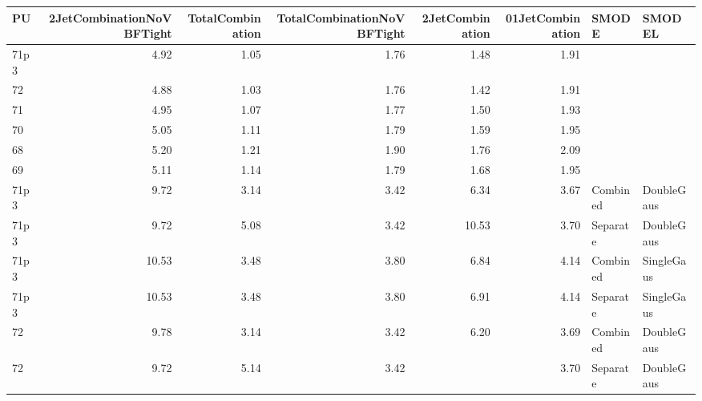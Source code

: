 \begin{tabular}{lrrrrrll}
\hline
 PU   &   2JetCombinationNoVBFTight &   TotalCombination &   TotalCombinationNoVBFTight &   2JetCombination &   01JetCombination & SMODE    & SMODEL     \\
\hline
 71p3 &                        4.92 &               1.05 &                         1.76 &              1.48 &               1.91 &          &            \\
 72   &                        4.88 &               1.03 &                         1.76 &              1.42 &               1.91 &          &            \\
 71   &                        4.95 &               1.07 &                         1.77 &              1.50 &               1.93 &          &            \\
 70   &                        5.05 &               1.11 &                         1.79 &              1.59 &               1.95 &          &            \\
 68   &                        5.20 &               1.21 &                         1.90 &              1.76 &               2.09 &          &            \\
 69   &                        5.11 &               1.14 &                         1.79 &              1.68 &               1.95 &          &            \\
 71p3 &                        9.72 &               3.14 &                         3.42 &              6.34 &               3.67 & Combined & DoubleGaus \\
 71p3 &                        9.72 &               5.08 &                         3.42 &             10.53 &               3.70 & Separate & DoubleGaus \\
 71p3 &                       10.53 &               3.48 &                         3.80 &              6.84 &               4.14 & Combined & SingleGaus \\
 71p3 &                       10.53 &               3.48 &                         3.80 &              6.91 &               4.14 & Separate & SingleGaus \\
 72   &                        9.78 &               3.14 &                         3.42 &              6.20 &               3.69 & Combined & DoubleGaus \\
 72   &                        9.72 &               5.14 &                         3.42 &                   &               3.70 & Separate & DoubleGaus \\

\end{tabular}
